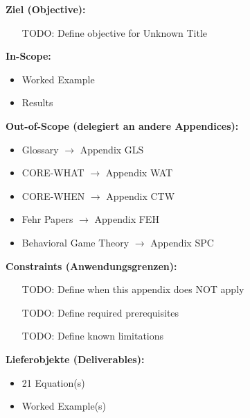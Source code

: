 
\begin{tcolorbox}[
    colback=orange!5!white,
    colframe=orange!75!black,
    title={\textbf{Appendix Scope: Ziel / In-Scope / Out-of-Scope / Constraints}},
    fonttitle=\bfseries
]

\textbf{Ziel (Objective):}
\begin{itemize}[nosep]
    \item [TODO: Define objective for Unknown Title]
\end{itemize}

\textbf{In-Scope:}
\begin{itemize}[nosep]
    \item Worked Example
    \item Results
\end{itemize}

\textbf{Out-of-Scope (delegiert an andere Appendices):}
\begin{itemize}[nosep]
    \item Glossary $\rightarrow$ Appendix GLS
    \item CORE-WHAT $\rightarrow$ Appendix WAT
    \item CORE-WHEN $\rightarrow$ Appendix CTW
    \item Fehr Papers $\rightarrow$ Appendix FEH
    \item Behavioral Game Theory $\rightarrow$ Appendix SPC
\end{itemize}

\textbf{Constraints (Anwendungsgrenzen):}
\begin{itemize}[nosep]
    \item [TODO: Define when this appendix does NOT apply]
    \item [TODO: Define required prerequisites]
    \item [TODO: Define known limitations]
\end{itemize}

\textbf{Lieferobjekte (Deliverables):}
\begin{itemize}[nosep]
    \item 21 Equation(s)
    \item Worked Example(s)
\end{itemize}

\end{tcolorbox}


